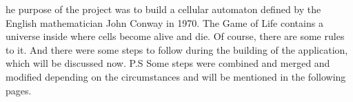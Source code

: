 he purpose of the project was to build a cellular automaton defined by the English mathematician John Conway in 1970. The Game of Life contains a universe inside where cells become alive and die. Of course, there are some rules to it. And there were some steps to follow during the building of the application, which will be discussed now. P.\+S Some steps were combined and merged and modified depending on the circumstances and will be mentioned in the following pages. 